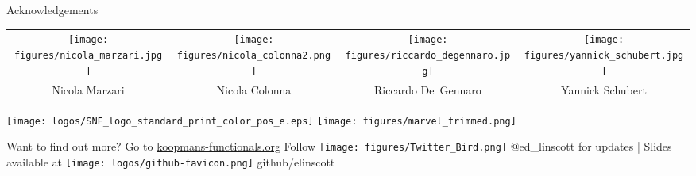 \documentclass[xcolor=table,aspectratio=169]{beamer}
\numberwithin{equation}{section}
\begin{document}
\begin{frame}{Acknowledgements}

   \begin{center}
      \footnotesize
      \begin{tabularx}{\textwidth}{CCCC}
         \texttt{[image: figures/nicola\_marzari.jpg]}     &
         \texttt{[image: figures/nicola\_colonna2.png]}    &
         \texttt{[image: figures/riccardo\_degennaro.jpg]} &
         \texttt{[image: figures/yannick\_schubert.jpg]}     \\
         Nicola Marzari                                                             &
         Nicola Colonna                                                             &
         Riccardo De~Gennaro                                                        &
         Yannick Schubert                                                             \\
      \end{tabularx}
   \end{center}
   \begin{center}
      \texttt{[image: logos/SNF\_logo\_standard\_print\_color\_pos\_e.eps]}
      \hspace{1em}
      \texttt{[image: figures/marvel\_trimmed.png]}
   \end{center}

   \vspace{1ex}
   \begin{center}
      Want to find out more? Go to \url{koopmans-functionals.org}
      \vspace{1em}
      Follow \texttt{[image: figures/Twitter\_Bird.png]} \textcolor{twitter_blue}{@ed\_linscott} for updates | Slides available at \texttt{[image: logos/github-favicon.png]} github/elinscott
   \end{center}


   \vspace{2ex}
   \scriptsize


   \vspace{2ex}
   \scriptsize
\end{frame}
\end{document}
